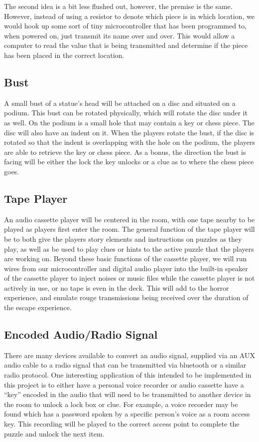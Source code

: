 \documentclass[conference]{IEEEtran}
\begin{document}
The second idea is a bit less flushed out, however, the premise is the same. However, instead of using
a resistor to denote which piece is in which location, we would hook up some sort of tiny microcontroller that
has been programmed to, when powered on, just transmit its name over and over. This would allow a computer
to read the value that is being transmitted and determine if the piece has been placed in the correct location.


\subsection{Bust}
A small bust of a statue's head will be attached on a disc and situated
on a podium. This bust can be rotated physically, which will rotate the
disc under it as well. On the podium is a small hole that may contain a key
or chess piece. The disc will also have an indent on it. When the players
rotate the bust, if the disc is rotated so that the indent is overlapping
with the hole on the podium, the players are able to retrieve the key
or chess piece. As a bonus, the direction the bust is facing will be either
the lock the key unlocks or a clue as to where the chess piece goes.

\subsection{Tape Player}
An audio cassette player will be centered in the room, with one tape nearby
to be played as players first enter the room. The general function of the tape
player will be to both give the players story elements and instructions on
puzzles as they play, as well as be used to play clues or hints to the active
puzzle that the players are working on. Beyond these basic functions of the
cassette player, we will run wires from our microcontroller and digital audio
player into the built-in speaker of the cassette player to inject noises or music
files while the cassette player is not actively in use, or no tape is even in the
deck. This will add to the horror experience, and emulate rouge transmissions
being received over the duration of the escape experience.

\subsection{Encoded Audio/Radio Signal}
There are many devices available to convert an audio signal, supplied via an AUX audio cable
to a radio signal that can be transmitted via bluetooth or a similar radio protocol. One interesting
application of this intended to be implemented in this project is to either have a personal voice recorder
or audio cassette have a ``key'' encoded in the audio that will need to be transmitted to another
device in the room to unlock a lock box or clue. For example, a voice recorder may be found which has
a password spoken by a specific person's voice as a room access key. This recording will be played
to the correct access point to complete the puzzle and unlock the next item.
\end{document}
